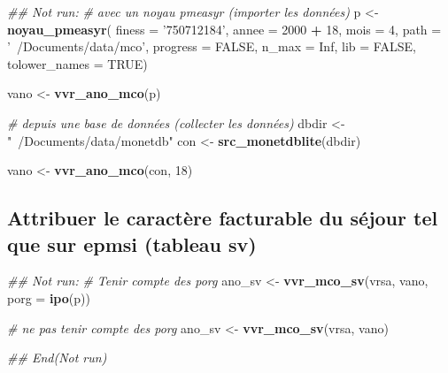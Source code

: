 \documentclass[]{book}
\newenvironment{Shaded}{\begin{snugshade}}{\end{snugshade}}
\newcommand{\CommentTok}[1]{\textcolor[rgb]{0.56,0.35,0.01}{\textit{#1}}}
\newcommand{\DataTypeTok}[1]{\textcolor[rgb]{0.13,0.29,0.53}{#1}}
\newcommand{\DecValTok}[1]{\textcolor[rgb]{0.00,0.00,0.81}{#1}}
\newcommand{\KeywordTok}[1]{\textcolor[rgb]{0.13,0.29,0.53}{\textbf{#1}}}
\newcommand{\NormalTok}[1]{#1}
\newcommand{\OperatorTok}[1]{\textcolor[rgb]{0.81,0.36,0.00}{\textbf{#1}}}
\newcommand{\OtherTok}[1]{\textcolor[rgb]{0.56,0.35,0.01}{#1}}
\newcommand{\StringTok}[1]{\textcolor[rgb]{0.31,0.60,0.02}{#1}}
\begin{document}
\begin{Shaded}
\begin{Highlighting}[]
\CommentTok{## Not run: }
\CommentTok{# avec un noyau pmeasyr (importer les données)}
\NormalTok{p <-}\StringTok{ }\KeywordTok{noyau_pmeasyr}\NormalTok{(}
  \DataTypeTok{finess   =} \StringTok{'750712184'}\NormalTok{,}
  \DataTypeTok{annee    =} \DecValTok{2000} \OperatorTok{+}\StringTok{ }\DecValTok{18}\NormalTok{,}
  \DataTypeTok{mois     =} \DecValTok{4}\NormalTok{,}
  \DataTypeTok{path     =} \StringTok{'~/Documents/data/mco'}\NormalTok{,}
  \DataTypeTok{progress =} \OtherTok{FALSE}\NormalTok{,}
  \DataTypeTok{n_max    =} \OtherTok{Inf}\NormalTok{,}
  \DataTypeTok{lib      =} \OtherTok{FALSE}\NormalTok{,}
  \DataTypeTok{tolower_names =} \OtherTok{TRUE}\NormalTok{)}

\NormalTok{vano <-}\StringTok{ }\KeywordTok{vvr_ano_mco}\NormalTok{(p)}

\CommentTok{# depuis une base de données (collecter les données)}
\NormalTok{dbdir <-}\StringTok{ "~/Documents/data/monetdb"}
\NormalTok{con <-}\StringTok{ }\KeywordTok{src_monetdblite}\NormalTok{(dbdir)}

\NormalTok{vano <-}\StringTok{ }\KeywordTok{vvr_ano_mco}\NormalTok{(con, }\DecValTok{18}\NormalTok{)}
\end{Highlighting}
\end{Shaded}

\hypertarget{attribuer-le-caractere-facturable-du-sejour-tel-que-sur-epmsi-tableau-sv}{%
\subsection{Attribuer le caractère facturable du séjour tel que sur epmsi (tableau sv)}\label{attribuer-le-caractere-facturable-du-sejour-tel-que-sur-epmsi-tableau-sv}}

\begin{Shaded}
\begin{Highlighting}[]
\CommentTok{## Not run: }
\CommentTok{# Tenir compte des porg}
\NormalTok{ano_sv <-}\StringTok{ }\KeywordTok{vvr_mco_sv}\NormalTok{(vrsa, vano, }\DataTypeTok{porg =} \KeywordTok{ipo}\NormalTok{(p))}

\CommentTok{# ne pas tenir compte des porg}
\NormalTok{ano_sv <-}\StringTok{ }\KeywordTok{vvr_mco_sv}\NormalTok{(vrsa, vano)}

\CommentTok{## End(Not run)}
\end{Highlighting}
\end{Shaded}
\end{document}
